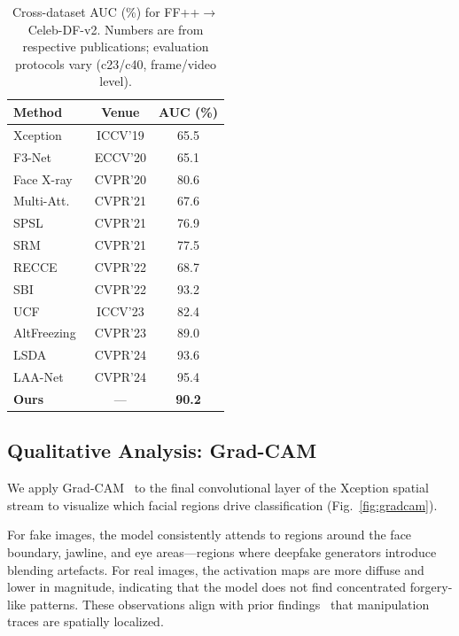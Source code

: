 \documentclass[conference]{IEEEtran}
\begin{document}
\begin{table}[t]
\centering
\caption{Cross-dataset AUC (\%) for FF++$\to$Celeb-DF-v2. Numbers are from respective publications; evaluation protocols vary (c23/c40, frame/video level).}
\label{tab:sota}
\begin{tabular}{lcc}
\toprule
\textbf{Method} & \textbf{Venue} & \textbf{AUC (\%)} \\
\midrule
Xception~\cite{rossler2019faceforensics}   & ICCV'19  & 65.5 \\
F3-Net~\cite{qian2020f3net}                & ECCV'20  & 65.1 \\
Face X-ray~\cite{li2020facexray}           & CVPR'20  & 80.6 \\
Multi-Att.~\cite{zhao2021multiattentional} & CVPR'21  & 67.6 \\
SPSL~\cite{liu2021spsl}                    & CVPR'21  & 76.9 \\
SRM~\cite{luo2021hf}                       & CVPR'21  & 77.5 \\
RECCE~\cite{cao2022recce}                  & CVPR'22  & 68.7 \\
SBI~\cite{shiohara2022sbi}                 & CVPR'22  & 93.2 \\
UCF~\cite{yan2023ucf}                      & ICCV'23  & 82.4 \\
AltFreezing~\cite{wang2023altfreezing}     & CVPR'23  & 89.0 \\
LSDA~\cite{chen2024lsda}                   & CVPR'24  & 93.6 \\
LAA-Net~\cite{nguyen2024laanet}            & CVPR'24  & 95.4 \\
\midrule
\textbf{Ours}                              & ---      & \textbf{90.2} \\
\bottomrule
\end{tabular}
\end{table}

\subsection{Qualitative Analysis: Grad-CAM}
We apply Grad-CAM~\cite{selvaraju2017gradcam} to the final convolutional layer of the Xception spatial stream to visualize which facial regions drive classification (Fig.~\ref{fig:gradcam}).

For fake images, the model consistently attends to regions around the face boundary, jawline, and eye areas---regions where deepfake generators introduce blending artefacts.
For real images, the activation maps are more diffuse and lower in magnitude, indicating that the model does not find concentrated forgery-like patterns.
These observations align with prior findings~\cite{zhao2021multiattentional} that manipulation traces are spatially localized.
\end{document}
